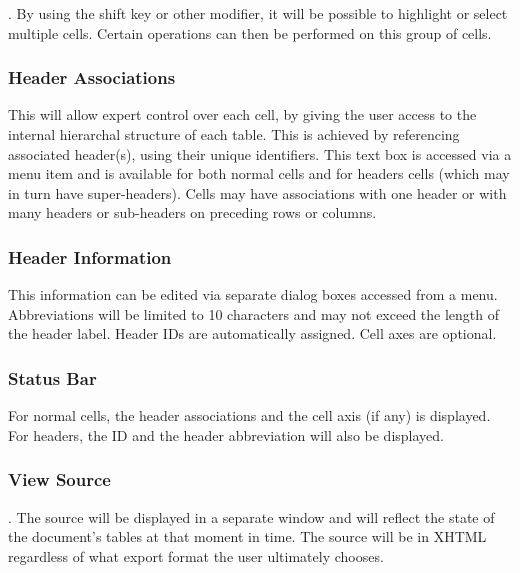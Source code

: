 . By using the shift key or other modifier, it will be possible
to highlight or select multiple cells. Certain operations can then be performed
on this group of cells.

\subsubsection{Header Associations}

 This will allow expert
control over each cell, by giving the user access to the internal hierarchal
structure of each table. This is achieved by referencing associated header(s),
using their unique identifiers. This text box is accessed via a menu item and
is available for both normal cells and for headers cells (which may in turn
have super-headers). Cells may have associations with one header or with many
headers or sub-headers on preceding rows or columns. 

\subsubsection{Header Information}

 This information can be edited via separate dialog boxes accessed
from a menu. Abbreviations will be limited to 10 characters and may not exceed
the length of the header label. Header IDs are automatically assigned. Cell
axes are optional.

\subsubsection{Status Bar}

 For normal cells, the header associations and the cell axis (if
any) is displayed. For headers, the ID and the header abbreviation will also be
displayed.

\subsubsection{View Source}

. The
source will be displayed in a separate window and will reflect the state of the
document's tables at that moment in time. The source will be in XHTML
regardless of what export format the user ultimately chooses.


